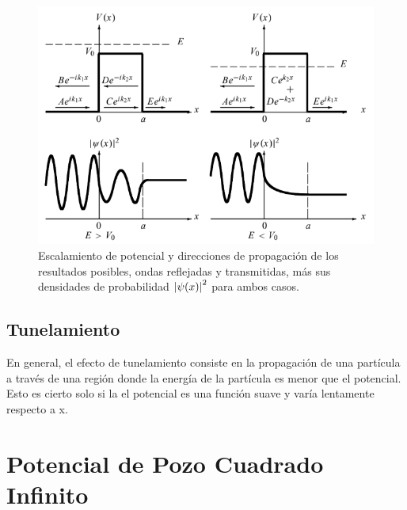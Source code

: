 \begin{figure}[H]
    \centering
    \includegraphics[scale=0.4]{img/potenciales_pozo.png}
    \caption{Escalamiento de potencial y direcciones de propagación de los resultados posibles, ondas reflejadas y transmitidas, más sus densidades de probabilidad $\abs{\psi (x)}^2$ para ambos casos.}
    \label{fig:pozo}
\end{figure}

\subsection{Tunelamiento}
En general, el efecto de tunelamiento consiste en la propagación de una partícula a través de una región donde la energía de la partícula es menor que el potencial. Esto es cierto solo si la el potencial es una función suave y varía lentamente respecto a x.



\section{Potencial de Pozo Cuadrado Infinito}

